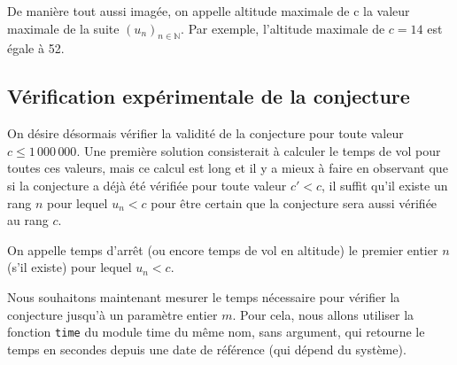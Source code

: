 De manière tout aussi imagée, on appelle altitude maximale de c la valeur maximale de la suite $\left(u_n\right)_{n\in \mathbb{N}}$. Par exemple, l’altitude maximale de $c = 14$ est égale à 52.


\subsection*{Vérification expérimentale de la conjecture}

On désire désormais vérifier la validité de la conjecture pour toute valeur $c \leq 1\,000\, 000$. Une première solution consisterait à calculer le temps de vol pour toutes ces valeurs, mais ce calcul est long et il y a mieux à faire en observant que si la conjecture a déjà été vérifiée pour toute valeur $c'<c$, il suffit qu’il existe un rang $n$ pour lequel $u_n < c$ pour être certain que la conjecture sera aussi vérifiée au rang $c$.


On appelle temps d’arrêt (ou encore temps de vol en altitude) le premier entier $n$ (s’il existe) pour lequel $u_n < c$.


Nous souhaitons maintenant mesurer le temps nécessaire pour vérifier la conjecture jusqu’à un paramètre entier $m$. Pour cela, nous allons utiliser la fonction \texttt{time} du module time du même nom, sans argument, qui retourne le temps en secondes depuis une date de référence (qui dépend du système).



